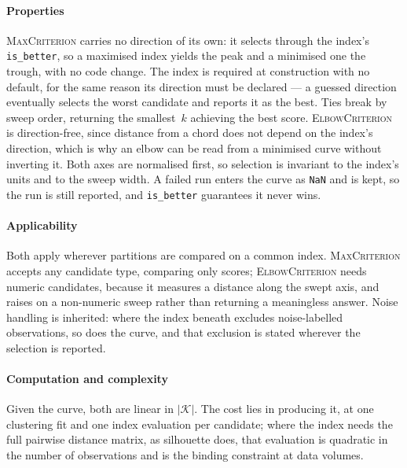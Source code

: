 \paragraph{Properties}
\label{sec:measure:relative:properties}
\textsc{MaxCriterion} carries no direction of its own: it selects through
the index's \texttt{is\_better}, so a maximised index yields the peak and a
minimised one the trough, with no code change. The index is required at
construction with no default, for the same reason its direction must be
declared --- a guessed direction eventually selects the worst candidate
and reports it as the best. Ties break by sweep order, returning the
smallest~$k$ achieving the best score. \textsc{ElbowCriterion} is
direction-free, since distance from a chord does not depend on the index's
direction, which is why an elbow can be read from a minimised curve
without inverting it. Both axes are normalised first, so selection is
invariant to the index's units and to the sweep width. A failed run enters
the curve as \texttt{NaN} and is kept, so the run is still reported, and
\texttt{is\_better} guarantees it never wins.

\paragraph{Applicability}
\label{sec:measure:relative:applicability}
Both apply wherever partitions are compared on a common index.
\textsc{MaxCriterion} accepts any candidate type, comparing only scores;
\textsc{ElbowCriterion} needs numeric candidates, because it measures a
distance along the swept axis, and raises on a non-numeric sweep rather
than returning a meaningless answer. Noise handling is inherited: where
the index beneath excludes noise-labelled observations, so does the curve,
and that exclusion is stated wherever the selection is reported.

\paragraph{Computation and complexity}
\label{sec:measure:relative:complexity}
Given the curve, both are linear in $|\mathcal{K}|$. The cost lies in
producing it, at one clustering fit and one index evaluation per
candidate; where the index needs the full pairwise distance matrix, as
silhouette does, that evaluation is quadratic in the number of
observations and is the binding constraint at \projectname{} data volumes.


